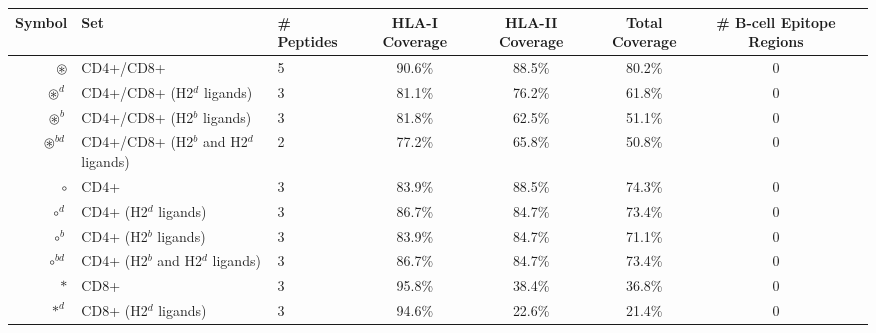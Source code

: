 \begin{tabular}{rllccccc}
\toprule
                                              Symbol &                                      Set &  \# Peptides & HLA-I Coverage & HLA-II Coverage & Total Coverage &  \# B-cell Epitope Regions \\
\midrule
                                     $ \circledast $ &                                CD4+/CD8+ &            5 &         90.6\% &          88.5\% &         80.2\% &                          0 \\
                                   $ \circledast^d $ &               CD4+/CD8+ (H2$^d$ ligands) &            3 &         81.1\% &          76.2\% &         61.8\% &                          0 \\
                                   $ \circledast^b $ &               CD4+/CD8+ (H2$^b$ ligands) &            3 &         81.8\% &          62.5\% &         51.1\% &                          0 \\
                                $ \circledast^{bd} $ &    CD4+/CD8+ (H2$^b$ and H2$^d$ ligands) &            2 &         77.2\% &          65.8\% &         50.8\% &                          0 \\
                                           $ \circ $ &                                     CD4+ &            3 &         83.9\% &          88.5\% &         74.3\% &                          0 \\
                                         $ \circ^d $ &                    CD4+ (H2$^d$ ligands) &            3 &         86.7\% &          84.7\% &         73.4\% &                          0 \\
                                         $ \circ^b $ &                    CD4+ (H2$^b$ ligands) &            3 &         83.9\% &          84.7\% &         71.1\% &                          0 \\
                                      $ \circ^{bd} $ &         CD4+ (H2$^b$ and H2$^d$ ligands) &            3 &         86.7\% &          84.7\% &         73.4\% &                          0 \\
                                            $ \ast $ &                                     CD8+ &            3 &         95.8\% &          38.4\% &         36.8\% &                          0 \\
                                          $ \ast^d $ &                    CD8+ (H2$^d$ ligands) &            3 &         94.6\% &          22.6\% &         21.4\% &                          0 \\

\end{tabular}
